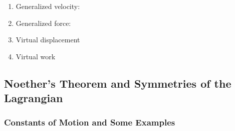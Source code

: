 \documentclass[11pt, a4paper]{article}
\begin{document}
\begin{enumerate}
	\item Generalized velocity:
	
	\item Generalized force:
	
	\item Virtual displacement
	
	\item Virtual work
\end{enumerate}
\fi




\subsection{Noether's Theorem and Symmetries of the Lagrangian}
\subsubsection{Constants of Motion and Some Examples} \label{sssec:consts_motion}
\end{document}
